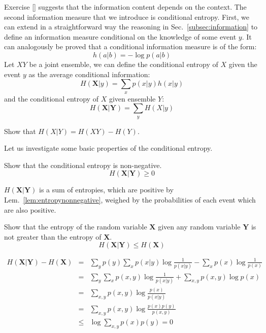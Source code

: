 Exercise \ref{} suggests that the information content depends on the context. The second information measure that we introduce is conditional entropy.
First, we can extend in a straightforward way the reasoning in Sec.~\ref{subsec:information} to define an information measure conditional on the knowledge of some event $y$. 
It can analogously be proved that a conditional information measure is of the form: 
\begin{equation}
h(a|b) = -\log p (a|b)
\end{equation}
Let $XY$ be a joint ensemble, we can define the conditional entropy of $X$ given the event $y$ as the average conditional information:
\begin{equation}
H(\mathbf{X}|y) = \sum_x p(x|y) h(x|y)
\end{equation}
and the conditional entropy of $X$ given ensemble $Y$:
\begin{equation}
H(\mathbf{X}|\mathbf{Y})=\sum_yH(X|y)
\end{equation}
\begin{exercise}
Show that $H(X|Y)=H(XY)-H(Y)$.
\end{exercise}
Let us investigate some basic properties of the conditional entropy.
\begin{exercise}Show that the conditional entropy is non-negative.
\begin{equation*}
H(\mathbf{X}|\mathbf{Y}) \geq 0
\end{equation*}
\end{exercise}
\begin{solution}
$H(\mathbf{X}|\mathbf{Y})$ is a sum of entropies, which are positive by Lem.~\ref{lem:entropynonnegative}, weighed by the probabilities of each event which are also positive.
\end{solution}

\begin{exercise}
\label{lem:entgeqcond}
Show that the entropy of the random variable $\mathbf{X}$ given any random variable $\mathbf{Y}$ is not greater than the entropy of $\mathbf{X}$.
\begin{equation*}
H(\mathbf{X}|\mathbf{Y}) \leq H(\mathbf{X})
\end{equation*}
\end{exercise}
\begin{solution}
\begin{eqnarray}
H(\mathbf{X}|\mathbf{Y}) - H(\mathbf{X}) &=& \sum_{y }p(y) \sum_{x} p(x|y)\log \frac{1}{p(x|y)} - \sum_{x}p(x) \log  \frac{1}{p(x)}\nonumber \\
                         &=& \sum_{y}\sum_{x}p(x,y) \log \frac{1}{p(x|y)} + \sum_{x,y}p(x,y) \log  p(x) \nonumber \\
                         &=& \sum_{x,y}p(x,y) \log  \frac{p(x)}{p(x|y)} \nonumber \\
                         &=& \sum_{x,y}p(x,y) \log  \frac{p(x)p(y)}{p(x,y)} \nonumber \\
                         &\leq & \log \sum_{x,y} p(x) p(y) = 0
\end{eqnarray}
\end{solution}

